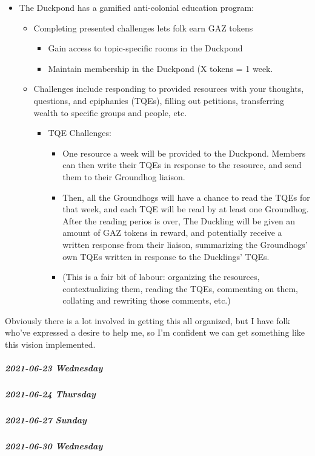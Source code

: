 \documentclass[11pt]{article}
\begin{document}
\begin{itemize}
\begin{itemize}
\begin{itemize}
\begin{itemize}
\item Ducklings can request new Groundhogs.
\end{itemize}
\item The Duckpond has a gamified anti-colonial education program:
\begin{itemize}
\item Completing presented challenges lets folk earn GAZ tokens
\begin{itemize}
\item Gain access to topic-specific rooms in the Duckpond
\item Maintain membership in the Duckpond (X tokens = 1 week.
\end{itemize}
\item Challenges include responding to provided resources with your thoughts, questions, and epiphanies (TQEs), filling out petitions, transferring wealth to specific groups and people, etc.
\begin{itemize}
\item TQE Challenges:
\begin{itemize}
\item One resource a week will be provided to the Duckpond. Members can then write their TQEs in response to the resource, and send them to their Groundhog liaison.
\item Then, all the Groundhogs will have a chance to read the TQEs for that week, and each TQE will be read by at least one Groundhog. After the reading perios is over, The Duckling will be given an amount of GAZ tokens in reward, and potentially receive a written response from their liaison, summarizing the Groundhogs' own TQEs written in response to the Ducklings' TQEs.
\item (This is a fair bit of labour: organizing the resources, contextualizing them, reading the TQEs, commenting on them, collating and rewriting those comments, etc.)
\end{itemize}
\end{itemize}
\end{itemize}
\end{itemize}
\end{itemize}


Obviously there is a lot involved in getting this all organized, but I have folk who've expressed a desire to help me, so I'm confident we can get something like this vision implemented.
\end{itemize}

\subparagraph*{2021-06-23 Wednesday}
\label{sec:org945d176}
\subparagraph*{2021-06-24 Thursday}
\label{sec:orge60601b}
\subparagraph*{2021-06-27 Sunday}
\label{sec:org4d688e7}
\subparagraph*{2021-06-30 Wednesday}
\label{sec:org495c36e}
\stopcontents[level-4]
\end{document}
